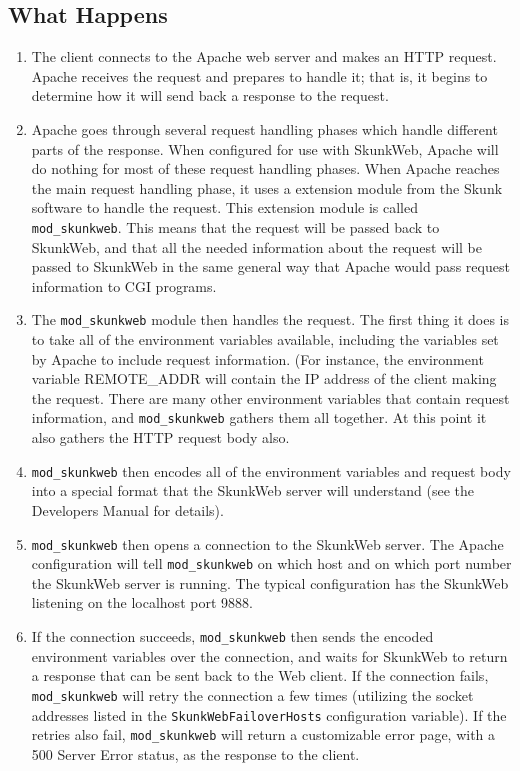 \documentclass[titlepage]{manual}
\begin{document}
\subsection{What Happens}
\begin{enumerate}
\item The client connects to the Apache web server and makes an HTTP
request. Apache receives the request and prepares to handle it; that
is, it begins to determine how it will send back a response to the
request.

\item Apache goes through several request handling phases which
handle different parts of the response. When configured for use with
SkunkWeb, Apache will do nothing for most of these request handling
phases.  When Apache reaches the main request handling phase, it
uses a extension module from the Skunk software to handle the request.
This extension module is called \texttt{mod\_skunkweb}.  This means
that the request will be passed back to SkunkWeb, and that all the
needed information about the request will be passed to SkunkWeb in the
same general way that Apache would pass request information to CGI
programs.

\item The \texttt{mod\_skunkweb} module then handles the request. The
first thing it does is to take all of the environment variables
available, including the variables set by Apache to include request
information. (For instance, the environment variable REMOTE\_ADDR will
contain the IP address of the client making the request.  There are
many other environment variables that contain request information, and
\texttt{mod\_skunkweb} gathers them all together.  At this point it
also gathers the HTTP request body also.

\item \texttt{mod\_skunkweb} then encodes all of the environment
variables and request body into a special format that the SkunkWeb
server will understand (see the Developers Manual for details).

\item \texttt{mod\_skunkweb} then opens a connection to the SkunkWeb
server. The Apache configuration will tell \texttt{mod\_skunkweb} on
which host and on which port number the SkunkWeb server is
running. The typical configuration has the SkunkWeb listening on 
the localhost port 9888.

\item If the connection succeeds, \texttt{mod\_skunkweb} then sends
the encoded environment variables over the connection, and waits for
SkunkWeb to return a response that can be sent back to the Web
client. If the connection fails, \texttt{mod\_skunkweb} will retry the
connection a few times (utilizing the socket addresses listed in the
\texttt{SkunkWebFailoverHosts} configuration variable). If the retries
also fail, \texttt{mod\_skunkweb} will return a customizable error
page, with a 500 Server Error status, as the response to the client.


\end{enumerate}
\end{document}
